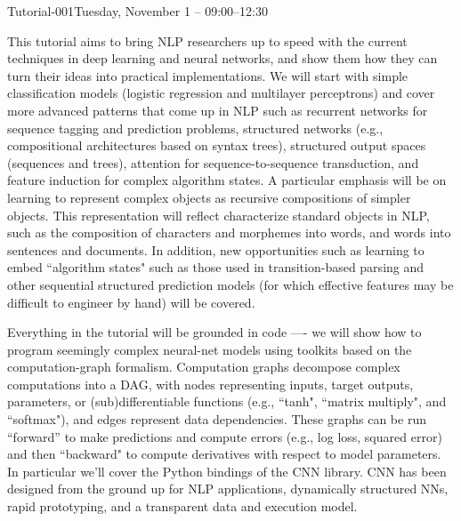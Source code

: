 \begin{tutorial}{Tutorial-001}{Tuesday, November 1 -- 09:00--12:30}
{\TutLocA}

 This tutorial aims to bring NLP researchers up to speed with the current techniques in deep learning and neural networks, and show them how they can turn their ideas into practical implementations. We will start with simple classification models (logistic regression and multilayer perceptrons) and cover more advanced patterns that come up in NLP such as recurrent networks for sequence tagging and prediction problems, structured networks (e.g., compositional architectures based on syntax trees), structured output spaces (sequences and trees), attention for sequence-to-sequence transduction, and feature induction for complex algorithm states. A particular emphasis will be on learning to represent complex objects as recursive compositions of simpler objects. This representation will reflect characterize standard objects in NLP, such as the composition of characters and morphemes into words, and words into sentences and documents. In addition, new opportunities such as learning to embed ``algorithm states" such as those used in transition-based parsing and other sequential structured prediction models (for which effective features may be difficult to engineer by hand) will be covered.

Everything in the tutorial will be grounded in code —- we will show how to program seemingly complex neural-net models using toolkits based on the computation-graph formalism. Computation graphs decompose complex computations into a DAG, with nodes representing inputs, target outputs, parameters, or (sub)differentiable functions (e.g., ``tanh", ``matrix multiply", and ``softmax"), and edges represent data dependencies. These graphs can be run “forward” to make predictions and compute errors (e.g., log loss, squared error) and then ``backward" to compute derivatives with respect to model parameters. In particular we'll cover the Python bindings of the CNN library. CNN has been designed from the ground up for NLP applications, dynamically structured NNs, rapid prototyping, and a transparent data and execution model. 

\end{tutorial} 

\clearpage{}

